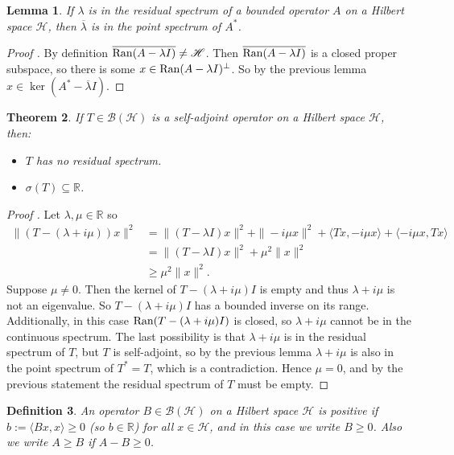 \documentclass[12pt,oneside]{report}
\newtheorem{thm}{Theorem}[chapter]
\newtheorem{lem}[thm]{Lemma}
\newtheorem{defn}[thm]{Definition}
\begin{document}
\begin{lem}
    If $\lambda$ is in the residual spectrum of a bounded operator $A$ on a Hilbert space $\mathscr{H}$, then $\overline{\lambda}$ is in the point spectrum of $A^{*}$.
\end{lem}
\begin{proof}[Proof \cite{Reed_Simon_1980}]
    By definition $\overline{\mathrm{Ran}(A - \lambda I)} \neq \mathscr{H}$. Then $\overline{\mathrm{Ran}(A - \lambda I)}$ is a closed proper subspace, so there is some $x \in \mathrm{Ran}(A - \lambda I)^{\perp}$. So by the previous lemma $x \in \ker(A^{*} - \overline{\lambda} I)$.
\end{proof}

\begin{thm}
    If $T \in \mathscr{B}(\mathscr{H})$ is a self-adjoint operator on a Hilbert space $\mathscr{H}$, then:
    \begin{itemize}
        \item[a)] $T$ has no residual spectrum.
        \item[b)] $\sigma(T) \subseteq \mathbb{R}$.
    \end{itemize}
\end{thm}
\begin{proof}[Proof \cite{Reed_Simon_1980}]
    Let $\lambda, \mu \in \mathbb{R}$ so 
    \begin{align*}
        \|(T - (\lambda + i \mu))x\|^{2} &= \|(T - \lambda I)x\|^{2} + \|-i \mu x\|^{2} + \langle Tx, -i \mu x \rangle + \langle -i \mu x, Tx \rangle \\
        &= \|(T - \lambda I)x\|^{2} +\mu^{2}\|x\|^{2} \\
        &\geq \mu^{2}\|x\|^{2}.
    \end{align*}
    Suppose $\mu \neq 0$. Then the kernel of $T - (\lambda + i \mu)I$ is empty and thus $\lambda + i \mu$ is not an eigenvalue. So $T - (\lambda + i \mu)I$ has a bounded inverse on its range. Additionally, in this case $\mathrm{Ran}(T - (\lambda + i \mu)I)$ is closed, so $\lambda + i \mu$ cannot be in the continuous spectrum. The last possibility is that $\lambda + i \mu$ is in the residual spectrum of $T$, but $T$ is self-adjoint, so by the previous lemma $\lambda + i \mu$ is also in the point spectrum of $T^{*} = T$, which is a contradiction. Hence $\mu = 0$, and by the previous statement the residual spectrum of $T$ must be empty.
\end{proof}

\begin{defn}
    An operator $B \in \mathscr{B}(\mathscr{H})$ on a Hilbert space $\mathscr{H}$ is positive if $b := \langle Bx, x \rangle \geq 0$ (so $b \in \mathbb{R}$) for all $x \in \mathscr{H}$, and in this case we write $B \geq 0$. Also we write $A \geq B$ if $A - B \geq 0$.
\end{defn}
\end{document}
